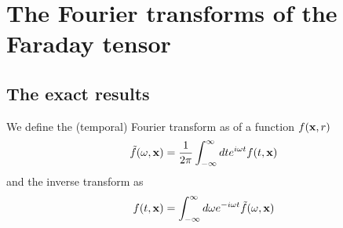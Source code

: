 \chapter{The Fourier transforms of the Faraday tensor}


\section{The exact results}
We define the (temporal) Fourier transform as of a function $f({\bf x},r)$
\begin{align}
    \tilde f(\omega,{\bf x})=\frac1{2\pi}\int_{-\infty}^{\infty}dt e^{i\omega t}f(t,{\bf x})
\end{align}
and the inverse transform as
\begin{align}
    f(t,{\bf x})=\int_{-\infty}^{\infty}d\omega e^{-i\omega t}\tilde f(\omega,{\bf x})
\end{align}

